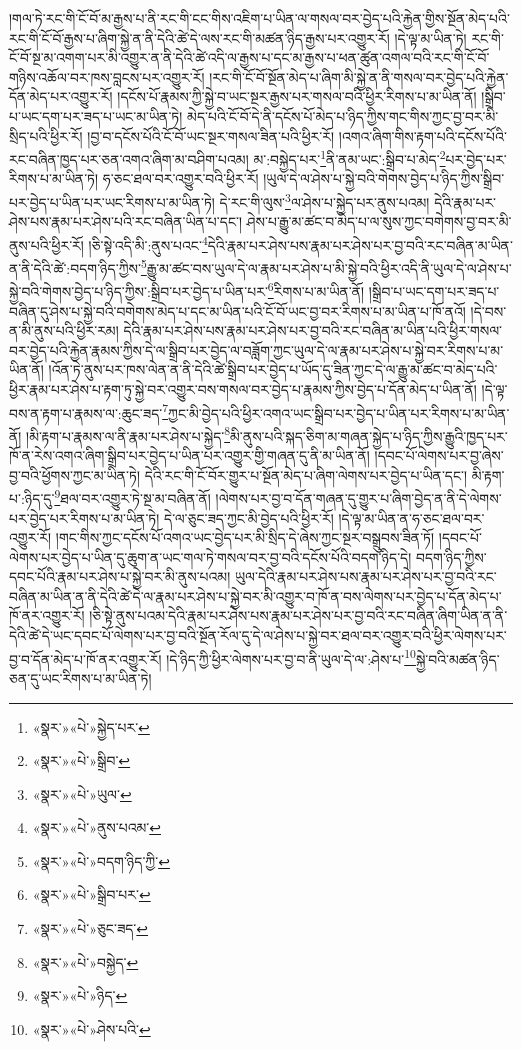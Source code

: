 །གལ་ཏེ་རང་གི་ངོ་བོ་མ་རྒྱས་པ་ནི་རང་གི་ངང་གིས་འཇིག་པ་ཡིན་ལ་གསལ་བར་བྱེད་པའི་རྐྱེན་གྱིས་སྔོན་མེད་པའི་རང་གི་ངོ་བོ་རྒྱས་པ་ཞིག་སྐྱེ་ན་ནི་དེའི་ཚེ་དེ་ལས་རང་གི་མཚན་ཉིད་རྒྱས་པར་འགྱུར་རོ། །དེ་ལྟ་མ་ཡིན་ཏེ། རང་གི་ངོ་བོ་སྔ་མ་འགག་པར་མི་འགྱུར་ན་ནི་དེའི་ཚེ་འདི་ལ་རྒྱས་པ་དང་མ་རྒྱས་པ་ཕན་ཚུན་འགལ་བའི་རང་གི་ངོ་བོ་གཉིས་འཆོལ་བར་ཁས་བླངས་པར་འགྱུར་རོ། །རང་གི་ངོ་བོ་སྔོན་མེད་པ་ཞིག་མི་སྐྱེ་ན་ནི་གསལ་བར་བྱེད་པའི་རྐྱེན་དོན་མེད་པར་འགྱུར་རོ། །དངོས་པོ་རྣམས་ཀྱི་སྐྱེ་བ་ཡང་སྔར་རྒྱས་པར་གསལ་བའི་ཕྱིར་རིགས་པ་མ་ཡིན་ནོ། །སྒྲིབ་པ་ཡང་དག་པར་ཟད་པ་ཡང་མ་ཡིན་ཏེ། མེད་པའི་ངོ་བོ་དེ་ནི་དངོས་པོ་མེད་པ་ཉིད་ཀྱིས་གང་གིས་ཀྱང་བྱ་བར་མི་སྲིད་པའི་ཕྱིར་རོ། །བྱ་བ་དངོས་པོའི་ངོ་བོ་ཡང་སྔར་གསལ་ཟིན་པའི་ཕྱིར་རོ། །འགའ་ཞིག་གིས་རྟག་པའི་དངོས་པོའི་རང་བཞིན་ཁྱད་པར་ཅན་འགའ་ཞིག་མ་བཤིག་པའམ། མ་:བསྐྱེད་པར་\footnote{«སྣར་»«པེ་»སྐྱེད་པར་}ནི་ནམ་ཡང་:སྒྲིབ་པ་མེད་\footnote{«སྣར་»«པེ་»སྒྲིབ་}པར་བྱེད་པར་རིགས་པ་མ་ཡིན་ཏེ། ཧ་ཅང་ཐལ་བར་འགྱུར་བའི་ཕྱིར་རོ། །ཡུལ་དེ་ལ་ཤེས་པ་སྐྱེ་བའི་གེགས་བྱེད་པ་ཉིད་ཀྱིས་སྒྲིབ་པར་བྱེད་པ་ཡིན་པར་ཡང་རིགས་པ་མ་ཡིན་ཏེ། དེ་རང་གི་ལུས་\footnote{«སྣར་»«པེ་»ཡུལ་}ལ་ཤེས་པ་སྐྱེད་པར་ནུས་པའམ། དེའི་རྣམ་པར་ཤེས་པས་རྣམ་པར་ཤེས་པའི་རང་བཞིན་ཡིན་པ་དང་། ཤེས་པ་རྒྱུ་མ་ཚང་བ་མེད་པ་ལ་སུས་ཀྱང་བགེགས་བྱ་བར་མི་ནུས་པའི་ཕྱིར་རོ། །ཅི་སྟེ་འདི་མི་:ནུས་པའང་\footnote{«སྣར་»«པེ་»ནུས་པའམ་}དེའི་རྣམ་པར་ཤེས་པས་རྣམ་པར་ཤེས་པར་བྱ་བའི་རང་བཞིན་མ་ཡིན་ན་ནི་དེའི་ཚེ་:བདག་ཉིད་ཀྱིས་\footnote{«སྣར་»«པེ་»བདག་ཉིད་ཀྱི་}རྒྱུ་མ་ཚང་བས་ཡུལ་དེ་ལ་རྣམ་པར་ཤེས་པ་མི་སྐྱེ་བའི་ཕྱིར་འདི་ནི་ཡུལ་དེ་ལ་ཤེས་པ་སྐྱེ་བའི་གེགས་བྱེད་པ་ཉིད་ཀྱིས་:སྒྲིབ་པར་བྱེད་པ་ཡིན་པར་\footnote{«སྣར་»«པེ་»སྒྲིབ་པར་}རིགས་པ་མ་ཡིན་ནོ། །སྒྲིབ་པ་ཡང་དག་པར་ཟད་པ་བཞིན་དུ་ཤེས་པ་སྐྱེ་བའི་བགེགས་མེད་པ་དང་མ་ཡིན་པའི་ངོ་བོ་ཡང་བྱ་བར་རིགས་པ་མ་ཡིན་པ་ཁོ་ནའོ། །དེ་བས་ན་མི་ནུས་པའི་ཕྱིར་རམ། དེའི་རྣམ་པར་ཤེས་པས་རྣམ་པར་ཤེས་པར་བྱ་བའི་རང་བཞིན་མ་ཡིན་པའི་ཕྱིར་གསལ་བར་བྱེད་པའི་རྐྱེན་རྣམས་ཀྱིས་དེ་ལ་སྒྲིབ་པར་བྱེད་ལ་བཟློག་ཀྱང་ཡུལ་དེ་ལ་རྣམ་པར་ཤེས་པ་སྐྱེ་བར་རིགས་པ་མ་ཡིན་ནོ། །འོན་ཏེ་ནུས་པར་ཁས་ལེན་ན་ནི་དེའི་ཚེ་སྒྲིབ་པར་བྱེད་པ་ཡོད་དུ་ཟིན་ཀྱང་དེ་ལ་རྒྱུ་མ་ཚང་བ་མེད་པའི་ཕྱིར་རྣམ་པར་ཤེས་པ་རྟག་ཏུ་སྐྱེ་བར་འགྱུར་བས་གསལ་བར་བྱེད་པ་རྣམས་ཀྱིས་བྱེད་པ་དོན་མེད་པ་ཡིན་ནོ། །དེ་ལྟ་བས་ན་རྟག་པ་རྣམས་ལ་:ཆུང་ཟད་\footnote{«སྣར་»«པེ་»ཅུང་ཟད་}ཀྱང་མི་བྱེད་པའི་ཕྱིར་འགའ་ཡང་སྒྲིབ་པར་བྱེད་པ་ཡིན་པར་རིགས་པ་མ་ཡིན་ནོ། །མི་རྟག་པ་རྣམས་ལ་ནི་རྣམ་པར་ཤེས་པ་སྐྱེད་\footnote{«སྣར་»«པེ་»བསྐྱེད་}མི་ནུས་པའི་སྐད་ཅིག་མ་གཞན་སྐྱེད་པ་ཉིད་ཀྱིས་རྒྱུའི་ཁྱད་པར་ཁོ་ན་རེས་འགའ་ཞིག་སྒྲིབ་པར་བྱེད་པ་ཡིན་པར་འགྱུར་གྱི་གཞན་དུ་ནི་མ་ཡིན་ནོ། །དབང་པོ་ལེགས་པར་བྱ་ཞེས་བྱ་བའི་ཕྱོགས་ཀྱང་མ་ཡིན་ཏེ། དེའི་རང་གི་ངོ་བོར་གྱུར་པ་སྔོན་མེད་པ་ཞིག་ལེགས་པར་བྱེད་པ་ཡིན་དང་། མི་རྟག་པ་:ཉིད་དུ་\footnote{«སྣར་»«པེ་»ཉིད་}ཐལ་བར་འགྱུར་ཏེ་སྔ་མ་བཞིན་ནོ། །ལེགས་པར་བྱ་བ་དོན་གཞན་དུ་གྱུར་པ་ཞིག་བྱེད་ན་ནི་དེ་ལེགས་པར་བྱེད་པར་རིགས་པ་མ་ཡིན་ཏེ། དེ་ལ་ཅུང་ཟད་ཀྱང་མི་བྱེད་པའི་ཕྱིར་རོ། །དེ་ལྟ་མ་ཡིན་ན་ཧ་ཅང་ཐལ་བར་འགྱུར་རོ། །གང་གིས་ཀྱང་དངོས་པོ་འགའ་ཡང་བྱེད་པར་མི་སྲིད་དེ་ཞེས་ཀྱང་སྔར་བསྒྲུབས་ཟིན་ཏོ། །དབང་པོ་ལེགས་པར་བྱེད་པ་ཡིན་དུ་ཆུག་ན་ཡང་གལ་ཏེ་གསལ་བར་བྱ་བའི་དངོས་པོའི་བདག་ཉིད་དེ། བདག་ཉིད་ཀྱིས་དབང་པོའི་རྣམ་པར་ཤེས་པ་སྐྱེ་བར་མི་ནུས་པའམ། ཡུལ་དེའི་རྣམ་པར་ཤེས་པས་རྣམ་པར་ཤེས་པར་བྱ་བའི་རང་བཞིན་མ་ཡིན་ན་ནི་དེའི་ཚེ་དེ་ལ་རྣམ་པར་ཤེས་པ་སྐྱེ་བར་མི་འགྱུར་བ་ཁོ་ན་བས་ལེགས་པར་བྱེད་པ་དོན་མེད་པ་ཁོ་ནར་འགྱུར་རོ། །ཅི་སྟེ་ནུས་པའམ་དེའི་རྣམ་པར་ཤེས་པས་རྣམ་པར་ཤེས་པར་བྱ་བའི་རང་བཞིན་ཞིག་ཡིན་ན་ནི་དེའི་ཚེ་དེ་ཡང་དབང་པོ་ལེགས་པར་བྱ་བའི་སྔོན་རོལ་དུ་དེ་ལ་ཤེས་པ་སྐྱེ་བར་ཐལ་བར་འགྱུར་བའི་ཕྱིར་ལེགས་པར་བྱ་བ་དོན་མེད་པ་ཁོ་ནར་འགྱུར་རོ། །དེ་ཉིད་ཀྱི་ཕྱིར་ལེགས་པར་བྱ་བ་ནི་ཡུལ་དེ་ལ་:ཤེས་པ་\footnote{«སྣར་»«པེ་»ཤེས་པའི་}སྐྱེ་བའི་མཚན་ཉིད་ཅན་དུ་ཡང་རིགས་པ་མ་ཡིན་ཏེ། 